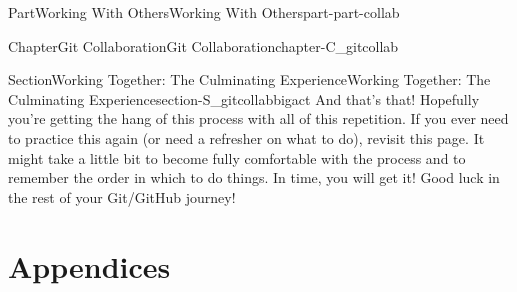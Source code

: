 \documentclass[twoside,10pt,]{book}
\begin{document}
\begin{partptx}{Part}{Working With Others}{}{Working With Others}{}{}{part-part-collab}
\begin{chapterptx}{Chapter}{Git Collaboration}{}{Git Collaboration}{}{}{chapter-C_gitcollab}
\begin{sectionptx}{Section}{Working Together: The Culminating Experience}{}{Working Together: The Culminating Experience}{}{}{section-S_gitcollabbigact}
%
And that's that! Hopefully you're getting the hang of this process with all of this repetition. If you ever need to practice this again (or need a refresher on what to do), revisit this page. It might take a little bit to become fully comfortable with the process and to remember the order in which to do things. In time, you will get it! Good luck in the rest of your Git\slash{}GitHub journey!%
\end{sectionptx}
\end{chapterptx}
\end{partptx}
%
\appendix%
%
\part*{Appendices}%
%
%
\typeout{************************************************}
\typeout{************************************************}
%
\end{document}
